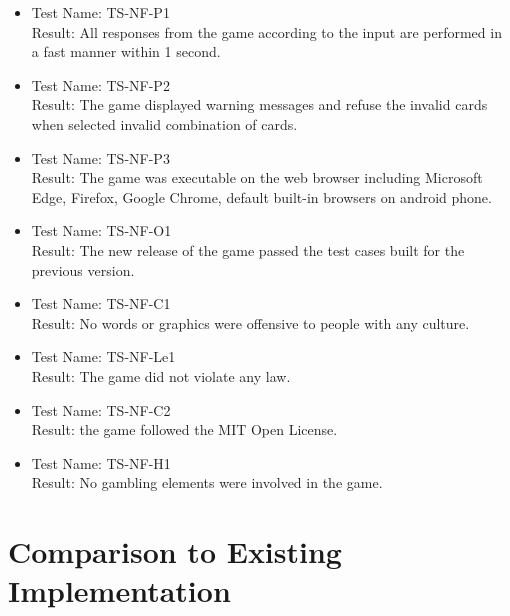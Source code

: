 \documentclass[12pt, titlepage]{article}
\begin{document}
\begin{itemize}

\item[]
Test Name: TS-NF-P1\\
Result: All responses from the game according to the input are performed in a fast manner within 1 second.

\item[]
Test Name: TS-NF-P2\\
Result: The game displayed warning messages and refuse the invalid cards when selected invalid combination of cards.

\item[]
Test Name: TS-NF-P3\\
Result: The game was executable on the web browser including Microsoft Edge, Firefox, Google Chrome, default built-in browsers on android phone.

\item[]
Test Name: TS-NF-O1\\
Result: The new release of the game passed the test cases built for the previous version.

\item[]
Test Name: TS-NF-C1\\
Result: No words or graphics were offensive to people with any culture.

\item[]
Test Name: TS-NF-Le1\\
Result: The game did not violate any law.

\item[]
Test Name: TS-NF-C2\\
Result: the game followed the MIT Open License.

\item[]
Test Name: TS-NF-H1\\
Result: No gambling elements were involved in the game.

\end{itemize}
	
\section{Comparison to Existing Implementation}	
\end{document}
